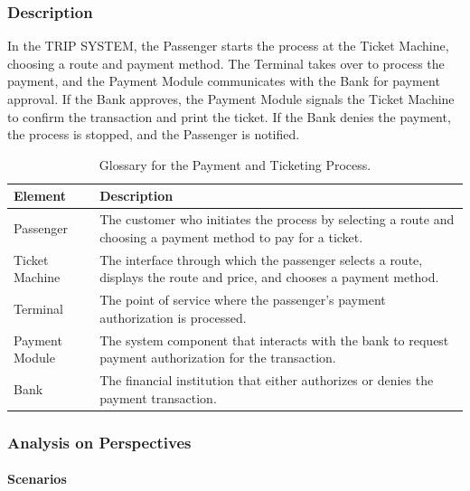 \subsubsection{Description}
In the TRIP SYSTEM, the Passenger starts the process at the Ticket Machine, choosing a route and payment method. The Terminal takes over to process the payment, and the Payment Module communicates with the Bank for payment approval. If the Bank approves, the Payment Module signals the Ticket Machine to confirm the transaction and print the ticket. If the Bank denies the payment, the process is stopped, and the Passenger is notified.

\begin{table}[H]
    \centering
    \caption{Glossary for the Payment and Ticketing Process.}
    \label{tab:payment_ticketing_glossary}
    \begin{tabularx}{\textwidth}{@{}lX@{}} %
    \toprule
    \textbf{Element} & \textbf{Description} \\
    \midrule
    Passenger & The customer who initiates the process by selecting a route and choosing a payment method to pay for a ticket. \\
    Ticket Machine & The interface through which the passenger selects a route, displays the route and price, and chooses a payment method. \\
    Terminal & The point of service where the passenger's payment authorization is processed. \\
    Payment Module & The system component that interacts with the bank to request payment authorization for the transaction. \\
    Bank & The financial institution that either authorizes or denies the payment transaction. \\
    \bottomrule
    \end{tabularx}
\end{table}

\subsubsection{Analysis on Perspectives}
\paragraph{Scenarios}

\scenarioThreeConcurrency

